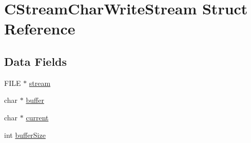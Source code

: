 \hypertarget{structCStreamCharWriteStream}{\section{C\+Stream\+Char\+Write\+Stream Struct Reference}
\label{structCStreamCharWriteStream}
}
\subsection*{Data Fields}
\begin{DoxyCompactItemize}
\item 
F\+I\+L\+E $\ast$ \hyperlink{structCStreamCharWriteStream_a2b45d904fe67c3b764f559c2c575c895}{stream}
\item 
char $\ast$ \hyperlink{structCStreamCharWriteStream_a6dde651f9319a133cc87ff1d00704e9d}{buffer}
\item 
char $\ast$ \hyperlink{structCStreamCharWriteStream_a0ea44c2c7b4f57056da34ca52023a09f}{current}
\item 
int \hyperlink{structCStreamCharWriteStream_a2bd0a0979c90381c931c05d516ff85cc}{buffer\+Size}
\end{DoxyCompactItemize}



